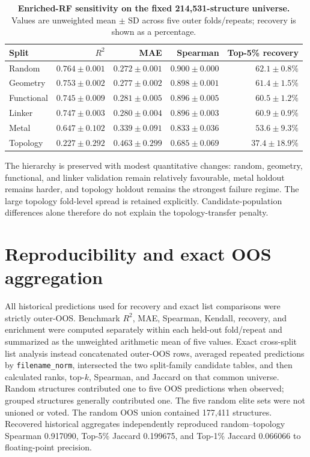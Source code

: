 \documentclass[11pt,a4paper]{article}
\begin{document}
\begin{table}[H]
\centering
\scriptsize
\caption{\textbf{Enriched-RF sensitivity on the fixed 214,531-structure universe.} Values are unweighted mean $\pm$ SD across five outer folds/repeats; recovery is shown as a percentage.}
\label{tab:fixed_universe}
\begin{tabular}{lrrrr}
\toprule
Split & $R^2$ & MAE & Spearman & Top-5\% recovery \\
\midrule
Random & $0.764\pm0.001$ & $0.272\pm0.001$ & $0.900\pm0.000$ & $62.1\pm0.8\%$ \\
Geometry & $0.753\pm0.002$ & $0.277\pm0.002$ & $0.898\pm0.001$ & $61.4\pm1.5\%$ \\
Functional & $0.745\pm0.009$ & $0.281\pm0.005$ & $0.896\pm0.005$ & $60.5\pm1.2\%$ \\
Linker & $0.747\pm0.003$ & $0.280\pm0.004$ & $0.896\pm0.003$ & $60.9\pm0.9\%$ \\
Metal & $0.647\pm0.102$ & $0.339\pm0.091$ & $0.833\pm0.036$ & $53.6\pm9.3\%$ \\
Topology & $0.227\pm0.292$ & $0.463\pm0.299$ & $0.685\pm0.069$ & $37.4\pm18.9\%$ \\
\bottomrule
\end{tabular}
\end{table}

The hierarchy is preserved with modest quantitative changes: random, geometry, functional, and linker validation remain relatively favourable, metal holdout remains harder, and topology holdout remains the strongest failure regime. The large topology fold-level spread is retained explicitly. Candidate-population differences alone therefore do not explain the topology-transfer penalty.

\section[Reproducibility and aggregation]{Reproducibility and exact OOS aggregation}
All historical predictions used for recovery and exact list comparisons were strictly outer-OOS. Benchmark $R^2$, MAE, Spearman, Kendall, recovery, and enrichment were computed separately within each held-out fold/repeat and summarized as the unweighted arithmetic mean of five values. Exact cross-split list analysis instead concatenated outer-OOS rows, averaged repeated predictions by \texttt{filename\_norm}, intersected the two split-family candidate tables, and then calculated ranks, top-$k$, Spearman, and Jaccard on that common universe. Random structures contributed one to five OOS predictions when observed; grouped structures generally contributed one. The five random elite sets were not unioned or voted. The random OOS union contained 177,411 structures. Recovered historical aggregates independently reproduced random--topology Spearman 0.917090, Top-5\% Jaccard 0.199675, and Top-1\% Jaccard 0.066066 to floating-point precision.
\end{document}
